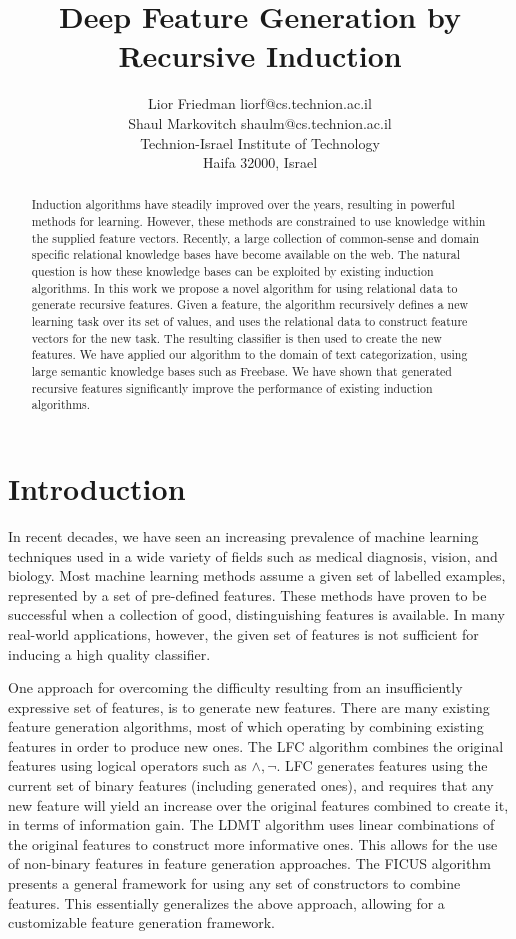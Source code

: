 \documentclass[twoside,11pt]{article}
\title{Deep Feature Generation by Recursive Induction}
\author{\name Lior Friedman \email liorf@cs.technion.ac.il \\
	\name Shaul Markovitch \email shaulm@cs.technion.ac.il \\
	\addr Technion-Israel Institute of Technology\\
	Haifa 32000, Israel
	}
\theoremstyle{definition}
\begin{document}
\maketitle

\begin{abstract}
  Induction algorithms have steadily improved over the years, resulting in powerful methods for learning. However, these methods are constrained to use knowledge within the supplied feature vectors. Recently, a large collection of common-sense and domain specific relational knowledge bases have become available on the web. The natural question is how these knowledge bases can be exploited by existing induction algorithms.
  In this work we propose a novel algorithm for using relational data to generate recursive features. Given a feature, the algorithm recursively defines a new learning task over its set of values, and uses the relational data to construct feature vectors for the new task. The resulting classifier is then used to create the new features.
  We have applied our algorithm to the domain of text categorization, using large semantic knowledge bases such as Freebase. We have shown that generated recursive features significantly improve the performance of existing induction algorithms.
\end{abstract}

\section{Introduction}
\label{sec:Intro}
In recent decades, we have seen an increasing prevalence of machine learning techniques used in a wide variety of fields such as medical diagnosis, vision, and biology.
Most machine learning methods assume a given set of labelled examples, represented by a set of
pre-defined features. These methods have proven to be successful when a collection of good,
distinguishing features is available.
In many real-world applications, however, the given set of features is not sufficient for inducing a high quality classifier.

One approach for overcoming the difficulty resulting from an insufficiently expressive set of features, is to generate new features. There are many existing feature generation algorithms, most of which operating by combining existing features in order to produce new ones. The LFC algorithm \cite{ragavan1993complex} combines the original features using logical operators such as $\land ,\lnot$. LFC generates features using the current set of binary features (including generated ones), and requires that any new feature will yield an increase over the original features combined to create it, in terms of information gain.
The LDMT algorithm \cite{utgo1991linear} uses linear combinations of the original features to construct more informative ones. This allows for the use of non-binary features in feature generation approaches.
The FICUS algorithm \cite{markovitch2002feature} presents a general framework for using any set of constructors to combine features. This essentially generalizes the above approach, allowing for a customizable feature generation framework.
\end{document}

